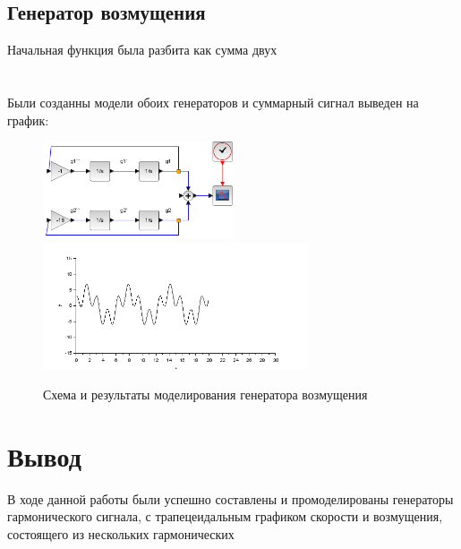 \documentclass[a4paper,12pt,russian]{article} %
\begin{document}
\subsection{Генератор возмущения}
Начальная функция была разбита как сумма двух\\
 \\

 \\ 


Были созданны модели обоих генераторов и суммарный сигнал выведен на график:\\
\begin{figure}[H]
	\includegraphics[width=0.5\textwidth]{distortion}
	\includegraphics[width=0.7\textwidth]{distortion-plot}
	\caption{Схема и результаты моделирования генератора возмущения}
\end{figure}


\section{Вывод}
В ходе данной работы были успешно составлены и промоделированы генераторы гармонического сигнала, с трапецеидальным графиком скорости и возмущения, состоящего из нескольких гармонических
\end{document}
